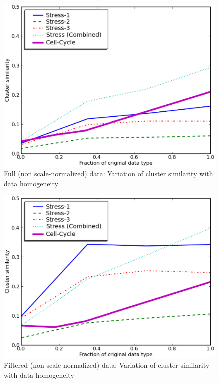 \begin{figure}[p]\centering
\includegraphics[scale=0.35]{chapter1/plot_unnorm.eps}
\caption{Full (non scale-normalized) data: Variation of cluster similarity with data homogeneity}
\label{graphs:all:unnorm}
\end{figure}

\begin{figure}[p]\centering
\includegraphics[scale=0.35]{chapter1/plot_filtered.eps}
\caption{Filtered (non scale-normalized) data: Variation of cluster similarity with data homogeneity}
\label{graphs:all:filtered}
\end{figure}

